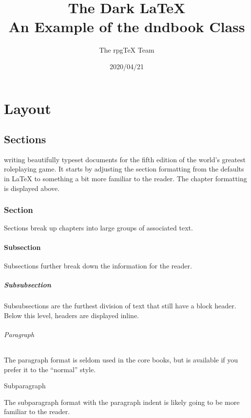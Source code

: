 \documentclass[letterpaper,twocolumn,openany,nodeprecatedcode]{dndbook}
\title{The Dark \LaTeX{} \\
\large An Example of the dndbook Class}
\author{The rpgTeX Team}
\date{2020/04/21}
\begin{document}
\frontmatter

\maketitle

\tableofcontents

\mainmatter%

\part{Layout}

\chapter{Sections}

 writing beautifully typeset documents for the fifth edition of the world's greatest roleplaying game. It starts by adjusting the section formatting from the defaults in \LaTeX{} to something a bit more familiar to the reader. The chapter formatting is displayed above.

\section{Section}
Sections break up chapters into large groups of associated text.

\subsection{Subsection}
Subsections further break down the information for the reader.

\subsubsection{Subsubsection}
Subsubsections are the furthest division of text that still have a block header. Below this level, headers are displayed inline.

\paragraph{Paragraph}
The paragraph format is seldom used in the core books, but is available if you prefer it to the ``normal'' style.

\subparagraph{Subparagraph}
The subparagraph format with the paragraph indent is likely going to be more familiar to the reader.
\end{document}
